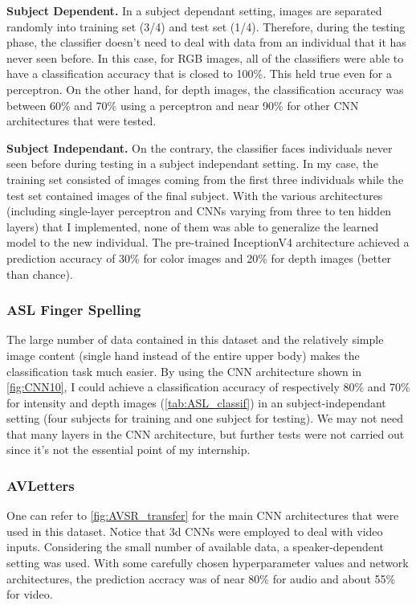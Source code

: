\textbf{Subject Dependent.}
In a subject dependant setting, images are separated randomly into
training set (3/4) and test set (1/4). Therefore, during the
testing phase, the classifier doesn't need to deal with data from an
individual that it has never seen before.
In this case, for RGB images, all of the classifiers were able to
have a classification accuracy that is closed to 100\%. This held true
even for a perceptron.
On the other hand, for depth images, the classification accuracy was
between 60\% and 70\% using a perceptron and near 90\% for other CNN
architectures that were tested.

\textbf{Subject Independant.}
On the contrary, the classifier faces individuals never seen before
during testing in a subject independant setting. 
In my case, the training set consisted of images coming from the
first three individuals while the test set contained images of
the final subject.
With the various architectures (including single-layer perceptron
and CNNs varying from three to ten hidden layers)
that I implemented, none of them was able to generalize the learned model
to the new individual.
The pre-trained InceptionV4 architecture \cite{C. Szegedy 2017}
achieved a prediction accuracy
of 30\% for color images and 20\% for depth images (better than chance).

\subsubsection{ASL Finger Spelling} \label{subsubsection:ASL_CNN}

The large number of data contained in this dataset and the relatively
simple image content (single hand instead of the entire upper body)
makes the classification task much easier. By using the CNN architecture
shown in \autoref{fig:CNN10}, I could achieve a classification accuracy
of respectively 80\% and 70\% for intensity and depth images
(\autoref{tab:ASL_classif})
in an subject-independant setting (four subjects for training and one
subject for testing). We may not need that many layers in the CNN
architecture, but further tests were not carried out since it's not
the essential point of my internship.

\subsubsection{AVLetters}

One can refer to \autoref{fig:AVSR_transfer} for the main CNN architectures
that were used in this dataset. 
Notice that 3d CNNs were employed to deal with video inputs.
Considering the small number of available data, a speaker-dependent
setting was used.
With some carefully chosen hyperparameter values and network architectures,
the prediction accracy was of near 80\% for audio and about 55\% for video.

